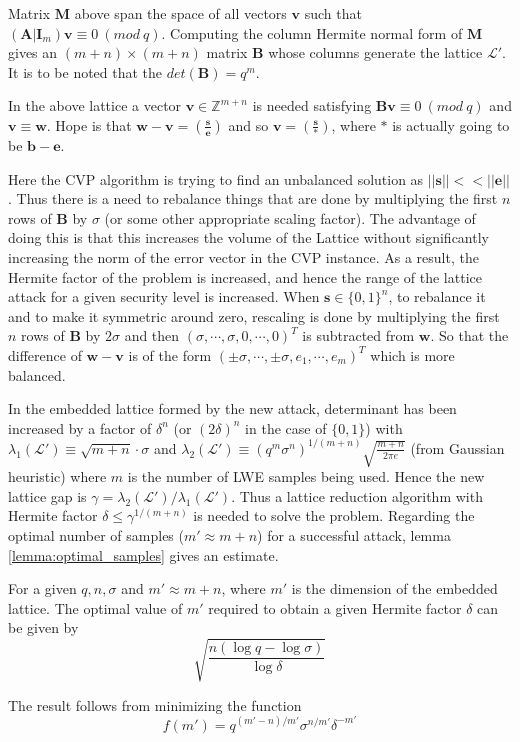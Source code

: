 Matrix $\pmb{M}$ above span the space of all vectors $\pmb{v}$ such that $(\pmb{A}|\pmb{I}_m)\pmb{v} \equiv 0 \ (mod\ q)$. Computing the column Hermite normal form of $\pmb{M}$ gives an $(m+n)\times (m+n)$ matrix $\pmb{B}$ whose columns generate the lattice $\mathcal{L}'$. It is to be noted that the $det(\pmb{B}) = q^m$.

In the above lattice a vector $\pmb{v} \in \mathbb{Z}^{m+n}$ is needed satisfying $\pmb{Bv} \equiv 0\ (mod\ q)$ and $\pmb{v} \equiv \pmb{w}$. Hope is that $\pmb{w} - \pmb{v} = (\frac{\pmb{s}}{\pmb{e}})$ and so $\pmb{v} = (\frac{\pmb{s}}{*})$, where $*$ is actually going to be $\pmb{b}-\pmb{e}$.

Here the CVP algorithm is trying to find an unbalanced solution as $||\pmb{s}||<<||\pmb{e}||$. Thus there is a need to rebalance things that are done by multiplying the first $n$ rows of $\pmb{B}$ by $\sigma$ (or some other appropriate scaling factor). The advantage of doing this is that this increases the volume of the Lattice without significantly increasing the norm of the error vector in the CVP instance. As a result, the Hermite factor of the problem is increased, and hence the range of the lattice attack for a given security level is increased. When $\pmb{s} \in \{0, 1\}^n$, to rebalance it and to make it symmetric around zero, rescaling is done by multiplying the first $n$ rows of $\pmb{B}$ by $2\sigma$ and then $(\sigma,\cdots,\sigma, 0,\cdots,0)^T$ is subtracted from $\pmb{w}$. So that the difference of $\pmb{w}-\pmb{v}$ is of the form
$(\pm \sigma, \cdots , \pm \sigma, e_1, \cdots , e_m)^T$ which is more balanced.

In the embedded lattice formed by the new attack, determinant has been increased by a factor of $\delta^n$ (or $(2\delta)^n$ in the case of $\{0, 1\}$) with $\lambda_1(\mathcal{L}') \equiv \sqrt{m+n}\cdot \sigma$ and $\lambda_2(\mathcal{L}') \equiv (q^m\sigma^n)^{1/(m+n)}\sqrt{\frac{m+n}{2\pi e}}$ (from Gaussian heuristic) where $m$ is the number of LWE samples being used. Hence the new lattice gap is $\gamma = \lambda_2(\mathcal{L}')/\lambda_1(\mathcal{L}')$. Thus a lattice reduction algorithm with Hermite factor $\delta \leq \gamma^{1/(m+n)}$ is needed to solve the problem. Regarding the optimal number of samples ($m' \approx m+n$) for a successful attack, lemma \ref{lemma:optimal_samples} gives an estimate.
\begin{lemma}
    \label{lemma:optimal_samples}
    For a given $q,n,\sigma$ and $m' \approx m+n$, where $m'$ is the dimension of the embedded lattice. The optimal value of $m'$ required to obtain a given Hermite factor $\delta$ can be given by
    \begin{equation*}
        \sqrt{\frac{n(\log{q}-\log{\sigma})}{\log{\delta}}}
    \end{equation*}
\end{lemma}
The result follows from minimizing the function
\begin{equation*}
    f(m') = q^{(m'-n)/m'}\sigma^{n/m'}\delta^{-m'}
\end{equation*}

